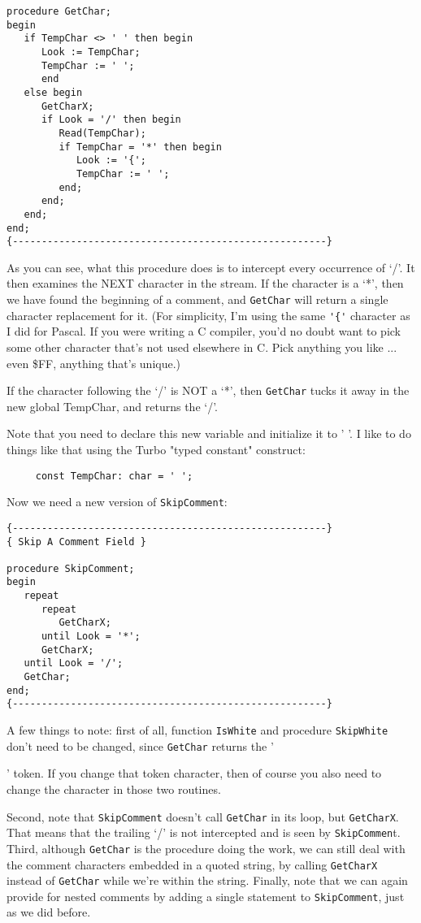 {{\begin{verbatim}
procedure GetChar;
begin
   if TempChar <> ' ' then begin
      Look := TempChar;
      TempChar := ' ';
      end
   else begin
      GetCharX;
      if Look = '/' then begin
         Read(TempChar);
         if TempChar = '*' then begin
            Look := '{';
            TempChar := ' ';
         end;
      end;
   end;
end;
{------------------------------------------------------}
\end{verbatim}

As you can see, what this procedure does is  to  intercept  every occurrence of `/'. It then examines the NEXT  character  in  the stream. If the character  is  a  `*', then  we  have  found the beginning  of  a  comment, and  {\tt GetChar}  will  return  a  single character replacement for it. (For  simplicity, I'm  using the same \verb|'{'| character  as I did for Pascal. If you were writing a C compiler, you'd no doubt want to pick some other character that's not  used  elsewhere  in C. Pick anything you like ... even \$FF, anything that's unique.)

If the character  following  the  `/'  is NOT a `*', then {\tt GetChar} tucks it away in the new global TempChar, and  returns  the  `/'.

Note that you need to declare this new variable and initialize it to ' '. I like to do  things  like  that  using the Turbo "typed constant" construct:

\begin{verbatim}
     const TempChar: char = ' ';
\end{verbatim}

Now we need a new version of {\tt SkipComment}:

\begin{verbatim}
{------------------------------------------------------}
{ Skip A Comment Field }

procedure SkipComment;
begin
   repeat
      repeat
         GetCharX;
      until Look = '*';
      GetCharX;
   until Look = '/';
   GetChar;
end;
{------------------------------------------------------}
\end{verbatim}

A  few  things  to  note:  first  of  all, function  {\tt IsWhite}  and procedure {\tt SkipWhite}  don't  need  to  be  changed, since {\tt GetChar} returns the '{' token. If you change that token  character, then of  course you also need to change the  character  in  those  two routines.

Second, note that  {\tt SkipComment}  doesn't call {\tt GetChar} in its loop, but  {\tt GetCharX}. That  means   that  the  trailing  `/'  is  not intercepted and  is seen by {\tt SkipCommen}t. Third, although {\tt GetChar} is the  procedure  doing  the  work, we  can still deal with the comment  characters  embedded  in  a  quoted  string, by calling {\tt GetCharX}  instead  of  {\tt GetChar}  while  we're  within  the string. Finally, note  that  we can again provide for nested comments by adding a single statement to {\tt SkipComment}, just as we did before.

}}}

